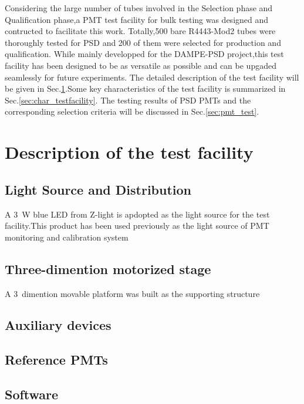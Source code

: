\documentclass[preprint,5p,times]{elsarticle}
\begin{document}
Considering the large number of tubes involved in the Selection phase and Qualification phase,a PMT test facility for bulk testing was designed and contructed to facilitate this work.
Totally,500 bare R4443-Mod2 tubes were thoroughly tested for PSD and 200 of them were selected for production and qualification.
While mainly developped for the DAMPE-PSD project,this test facility has been designed to be as versatile as possible and can be upgaded seamlessly for future experiments.
The detailed description of the test facility will be given in Sec.\ref{sec:description}.Some key characteristics of the test facility is summarized in Sec.\ref{sec:char_testfacility}.
The testing results of PSD PMTs and the corresponding selection criteria will be discussed in Sec.\ref{sec:pmt_test}.
\section{Description of the test facility}
\label{sec:description}


\subsection{Light Source and Distribution}
\label{sec:light_source}

A 3~W blue LED from Z-light\cite{zlight} is apdopted as the light source for the test facility.This product has been used previously as the light source of PMT monitoring and calibration system\cite{yuyuhong_led} 

\subsection{Three-dimention motorized stage}
\label{sec:platform}

A 3~dimention movable platform was built as the supporting structure

\subsection{Auxiliary devices}
\label{sec:integrating_sphere}

\subsection{Reference PMTs}
\label{sec:ref_pmt}

\subsection{Software}
\label{sec:control_daq}
\end{document}
